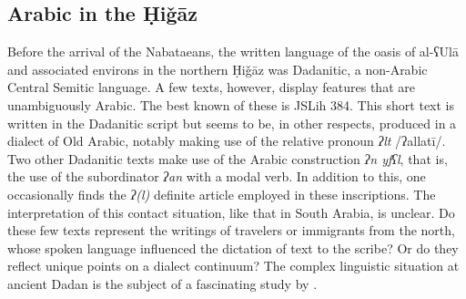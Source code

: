 \documentclass[output=paper]{langsci/langscibook}
\begin{document}
\subsection{Arabic in the Ḥiǧāz}
Before the arrival of the Nabataeans, the written language of the oasis of al-ʕUlā and associated environs in the northern Ḥiǧāz was Dadanitic, a non-Arabic Central Semitic language. A few texts, however, display features that are unambiguously Arabic. The best known of these is JSLih 384. This short text is written in the Dadanitic script but seems to be, in other respects, produced in a dialect of Old Arabic, notably making use of the relative pronoun \textit{ʔlt} /ʔallatī/. Two other Dadanitic texts make use of the Arabic construction \textit{ʔn yfʕl}, that is, the use of the subordinator \textit{ʔan} with a modal verb. In addition to this, one occasionally finds the \textit{ʔ(l)} definite article employed in these inscriptions. The interpretation of this contact situation, like that in South Arabia, is unclear. Do these few texts represent the writings of travelers or immigrants from the north, whose spoken language influenced the dictation of text to the scribe? Or do they reflect unique points on a dialect continuum? The complex linguistic situation at ancient Dadan is the subject of a fascinating study by \citet{Kootstra2019}.
\end{document}
